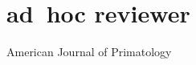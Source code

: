 \documentclass[]{friggeri-cv}
\begin{document}




\section{ad~hoc reviewer}
    American Journal of Primatology \\[-.1cm]%


\end{document}
